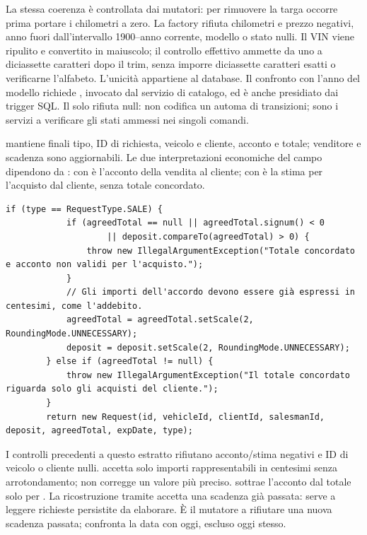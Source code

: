 La stessa coerenza è controllata dai mutatori: per rimuovere la targa occorre
prima portare i chilometri a zero. La factory rifiuta chilometri e prezzo
negativi, anno fuori dall'intervallo 1900--anno corrente, modello o stato
nulli. Il VIN viene ripulito e convertito in maiuscolo; il controllo
effettivo ammette da uno a diciassette caratteri dopo il trim, senza imporre
diciassette caratteri esatti o verificarne l'alfabeto. L'unicità appartiene
al database. Il confronto con l'anno del modello richiede
, invocato dal servizio di catalogo, ed è
anche presidiato dai trigger SQL. Il solo  rifiuta null:
non codifica un automa di transizioni; sono i servizi a verificare gli stati
ammessi nei singoli comandi.

 mantiene finali tipo, ID di richiesta, veicolo e cliente,
acconto e totale;
venditore e scadenza sono aggiornabili. Le due interpretazioni economiche
del campo  dipendono da : con 
è l'acconto della vendita al cliente; con  è la stima per
l'acquisto dal cliente, senza totale concordato.

\noindent\begin{minipage}{\linewidth}
\begin{lstlisting}[firstnumber=54,caption={\code{Request.java}: forma dell'accordo e precisione degli importi.},
  label=lst:request-accordo]
        if (type == RequestType.SALE) {
            if (agreedTotal == null || agreedTotal.signum() < 0
                    || deposit.compareTo(agreedTotal) > 0) {
                throw new IllegalArgumentException("Totale concordato e acconto non validi per l'acquisto.");
            }
            // Gli importi dell'accordo devono essere già espressi in centesimi, come l'addebito.
            agreedTotal = agreedTotal.setScale(2, RoundingMode.UNNECESSARY);
            deposit = deposit.setScale(2, RoundingMode.UNNECESSARY);
        } else if (agreedTotal != null) {
            throw new IllegalArgumentException("Il totale concordato riguarda solo gli acquisti del cliente.");
        }
        return new Request(id, vehicleId, clientId, salesmanId, deposit, agreedTotal, expDate, type);
\end{lstlisting}
\end{minipage}


I controlli precedenti a questo estratto rifiutano acconto/stima negativi
e ID di veicolo o cliente nulli.  accetta solo importi
rappresentabili in centesimi senza arrotondamento; non corregge un valore
più preciso.  sottrae l'acconto dal totale solo
per . La ricostruzione tramite  accetta una
scadenza già passata: serve a leggere richieste persistite da elaborare.
È il mutatore  a rifiutare una nuova scadenza passata;
 confronta la data con oggi, escluso oggi stesso.

